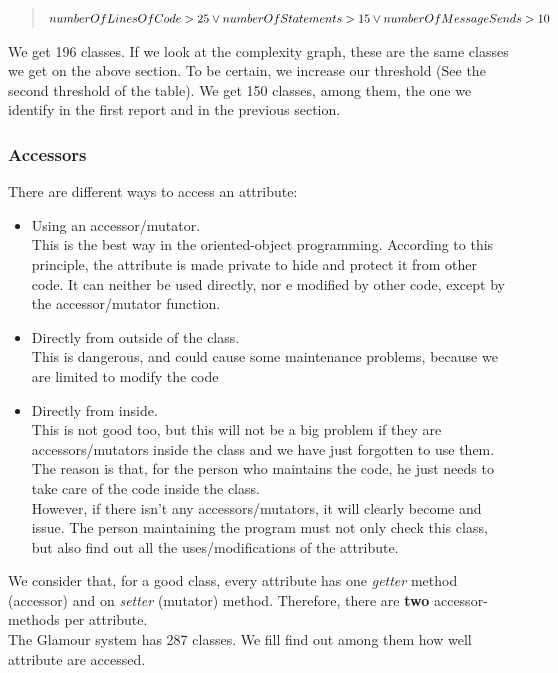 \documentclass[11pt,a4paper]{article}
\begin{document}
\begin{quote} $ numberOfLinesOfCode > 25 \\ \vee numberOfStatements > 15 \\ \vee numberOfMessageSends > 10$\\\end{quote}

We get 196 classes. If we look at the complexity graph, these are the same classes we get on the above section. To be certain, we increase our threshold (See the second threshold of the table). We get 150 classes, among them, the one we identify in the first report and in the previous section. 
\subsubsection{Accessors}
There are different ways to access an attribute:
\begin{itemize}
\item Using an accessor/mutator.\\ This is the best way in the oriented-object programming. According to this principle, the attribute is made private to hide and protect it from other code. It can neither be used directly, nor e modified by other code, except by the accessor/mutator function.
\item Directly from outside of the class. \\ This is dangerous, and could cause some maintenance problems, because we are limited to modify the code
\item Directly from inside. \\ This is not good too, but this will not be a big problem if they are accessors/mutators inside the class and we have just forgotten to use them. The reason is that, for the person who maintains the code, he just needs to take care of the code inside the class.\\ However, if there isn't any accessors/mutators, it will clearly become and issue. The person maintaining the program must not only check this class, but also find out all the uses/modifications of the attribute.
\end{itemize}

We consider that, for a good class, every attribute has one \textit{getter} method (accessor) and on \textit{setter} (mutator) method. Therefore, there are \textbf{two} accessor-methods per attribute.\\

The Glamour system has 287 classes. We fill find out among them how well attribute are accessed.\\
\end{document}
